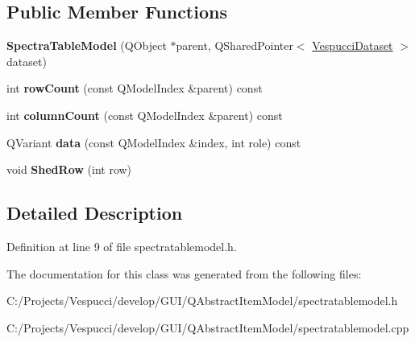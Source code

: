 \subsection*{Public Member Functions}
\begin{DoxyCompactItemize}
\item 
\hypertarget{class_spectra_table_model_aa45b7aa24b474d23f87e1fd0cfb8c95d}{{\bfseries Spectra\+Table\+Model} (Q\+Object $\ast$parent, Q\+Shared\+Pointer$<$ \hyperlink{class_vespucci_dataset}{Vespucci\+Dataset} $>$ dataset)}\label{class_spectra_table_model_aa45b7aa24b474d23f87e1fd0cfb8c95d}

\item 
\hypertarget{class_spectra_table_model_aa95ffaebe3561834f04f052ca2c0e0af}{int {\bfseries row\+Count} (const Q\+Model\+Index \&parent) const }\label{class_spectra_table_model_aa95ffaebe3561834f04f052ca2c0e0af}

\item 
\hypertarget{class_spectra_table_model_a89154e9842dc80dd6a7d8cb3e0f06081}{int {\bfseries column\+Count} (const Q\+Model\+Index \&parent) const }\label{class_spectra_table_model_a89154e9842dc80dd6a7d8cb3e0f06081}

\item 
\hypertarget{class_spectra_table_model_a342738c2ad4cf34982ad878996a7759b}{Q\+Variant {\bfseries data} (const Q\+Model\+Index \&index, int role) const }\label{class_spectra_table_model_a342738c2ad4cf34982ad878996a7759b}

\item 
\hypertarget{class_spectra_table_model_a93b39faeccf37b7234d4b0524938adb1}{void {\bfseries Shed\+Row} (int row)}\label{class_spectra_table_model_a93b39faeccf37b7234d4b0524938adb1}

\end{DoxyCompactItemize}


\subsection{Detailed Description}


Definition at line 9 of file spectratablemodel.\+h.



The documentation for this class was generated from the following files\+:\begin{DoxyCompactItemize}
\item 
C\+:/\+Projects/\+Vespucci/develop/\+G\+U\+I/\+Q\+Abstract\+Item\+Model/spectratablemodel.\+h\item 
C\+:/\+Projects/\+Vespucci/develop/\+G\+U\+I/\+Q\+Abstract\+Item\+Model/spectratablemodel.\+cpp\end{DoxyCompactItemize}
